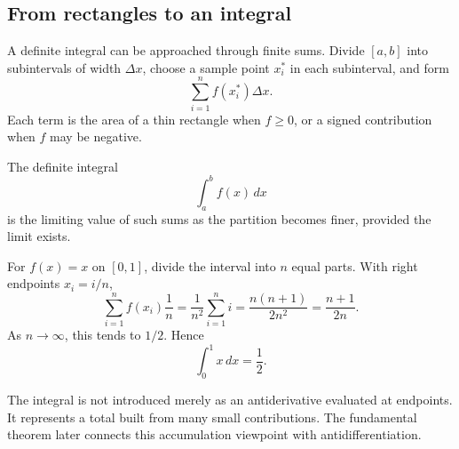\subsection{From rectangles to an integral}

A definite integral can be approached through finite sums. Divide \([a,b]\) into subintervals of width \(\Delta x\), choose a sample point \(x_i^*\) in each subinterval, and form
\[
\sum_{i=1}^{n} f(x_i^*)\Delta x.
\]
Each term is the area of a thin rectangle when \(f\ge0\), or a signed contribution when \(f\) may be negative.

\begin{definitionbox}
The definite integral
\[
\int_a^b f(x)\,dx
\]
is the limiting value of such sums as the partition becomes finer, provided the limit exists.
\end{definitionbox}

\begin{examplebox}
For \(f(x)=x\) on \([0,1]\), divide the interval into \(n\) equal parts. With right endpoints \(x_i=i/n\),
\[
\sum_{i=1}^{n} f(x_i)\frac1n
=\frac1{n^2}\sum_{i=1}^{n}i
=\frac{n(n+1)}{2n^2}
=\frac{n+1}{2n}.
\]
As \(n\to\infty\), this tends to \(1/2\). Hence
\[
\int_0^1 x\,dx=\frac12.
\]
\end{examplebox}

\begin{interpretationbox}
The integral is not introduced merely as an antiderivative evaluated at endpoints. It represents a total built from many small contributions. The fundamental theorem later connects this accumulation viewpoint with antidifferentiation.
\end{interpretationbox}
